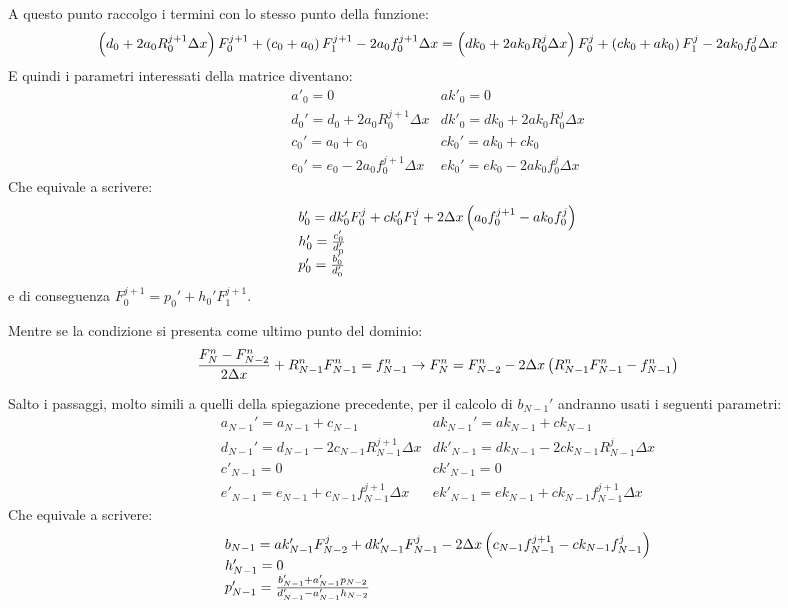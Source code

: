 A questo punto raccolgo i termini con lo stesso punto della funzione:
\begin{equation}
\left( d_0 + 2 a_0 R_0^{j+1}\Delta x \right) F_0^{j+1} + \left( c_0+a_0 \right)F^{j+1}_1 
- 2 a_0 f^{j+1}_0 \Delta x = 
\left( dk_0 + 2 ak_0 R_0^{j}\Delta x \right) F_0^{j} + \left( ck_0+ak_0 \right)F^{j}_1 
- 2 ak_0 f^j_0 \Delta x
\end{equation}
E quindi i parametri interessati della matrice diventano:
\begin{equation}
\begin{array}{ll}
a'_0 = 0 & ak'_0= 0\\
d_0' = d_0 + 2 a_0 R_0^{j+1}\Delta x& dk'_0 = dk_0 + 2 ak_0 R_0^{j}\Delta x\\
c_0' = a_0+c_0 & ck_0' = ak_0+ck_0\\
e_0' = e_0 - 2 a_0  f^{j+1}_0 \Delta x & ek_0' = ek_0 - 2 ak_0  f^{j}_0 \Delta x
\end{array}
\end{equation}
Che equivale a scrivere:
\begin{equation}
\begin{array}{l}
b_0' = dk'_0 F_0^j  + ck_0' F_1^j + 2 \Delta x \left( a_0 f^{j+1}_0-ak_0 f^j_0 \right)\\
h_0' = \frac{c_0'}{d_0'}\\
p_0' = \frac{b_0'}{d_0'}
\end{array}
\end{equation}
e di conseguenza $F_0^{j+1} = p_{0}' + h_0' F_1^{j+1}$.

Mentre se la condizione si presenta come ultimo punto del dominio:
\begin{equation}
\frac{F_{N}^{n}-F_{N-2}^{n}}{2\Delta x} + R_{N-1}^nF_{N-1}^{n} = f_{N-1}^n  \to 
F_{N}^{n} = F_{N-2}^{n} - 2\Delta x \left( R_{N-1}^nF_{N-1}^{n}-f^n_{N-1} \right)
\end{equation}

Salto i passaggi, molto simili a quelli della spiegazione precedente,
per il calcolo di $b_{N-1}'$ andranno usati i seguenti parametri:
\begin{equation}
\begin{array}{ll}
a_{N-1}' = a_{N-1}+c_{N-1} & ak_{N-1}' = ak_{N-1}+ck_{N-1}\\
d_{N-1}' = d_{N-1} - 2 c_{N-1} R_{N-1}^{j+1}\Delta x& dk'_{N-1} = dk_{N-1} - 2 ck_{N-1} R_{N-1}^{j}\Delta x\\
c'_{N-1} = 0 & ck'_{N-1}= 0\\
e'_{N-1} = e_{N-1} + c_{N-1} f^{j+1}_{N-1}\Delta x & ek'_{N-1} = ek_{N-1} + ck_{N-1} f^{j+1}_{N-1}\Delta x
\end{array}
\end{equation}
Che equivale a scrivere:
\begin{equation}
\begin{array}{l}
b_{N-1} = ak_{N-1}' F_{N-2}^j + dk'_{N-1} F_{N-1}^j - 2 \Delta x \left( c_{N-1} f^{j+1}_{N-1}-ck_{N-1} f^j_{N-1} \right)\\
h_{N-1}' = 0\\
p_{N-1}' = \frac{b_{N-1}' + a_{N-1}'p_{N-2}}{d_{N-1}' - a_{N-1}'h_{N-2}}
\end{array}
\end{equation}

